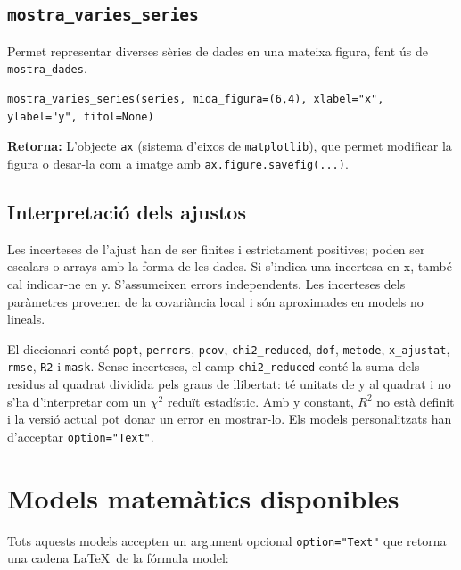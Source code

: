 \documentclass[11pt,a4paper]{article}
\begin{document}
\subsection{\texttt{mostra\_varies\_series}}
Permet representar diverses sèries de dades en una mateixa figura, fent ús de \texttt{mostra\_dades}.
\begin{lstlisting}
mostra_varies_series(series, mida_figura=(6,4), xlabel="x", ylabel="y", titol=None)
\end{lstlisting}
\textbf{Retorna:} L’objecte \texttt{ax} (sistema d’eixos de \texttt{matplotlib}),
que permet modificar la figura o desar-la com a imatge amb \texttt{ax.figure.savefig(...)}.

\subsection{Interpretació dels ajustos}
Les incerteses de l'ajust han de ser finites i estrictament positives;
poden ser escalars o arrays amb la forma de les dades. Si s'indica una
incertesa en x, també cal indicar-ne en y. S'assumeixen errors independents.
Les incerteses dels paràmetres provenen de la covariància local i són
aproximades en models no lineals.

El diccionari conté \texttt{popt}, \texttt{perrors}, \texttt{pcov},
\texttt{chi2\_reduced}, \texttt{dof}, \texttt{metode}, \texttt{x\_ajustat},
\texttt{rmse}, \texttt{R2} i \texttt{mask}.
Sense incerteses, el camp \texttt{chi2\_reduced} conté la suma dels residus
al quadrat dividida pels graus de llibertat: té unitats de y al quadrat i
no s'ha d'interpretar com un $\chi^2$ reduït estadístic.
Amb y constant, $R^2$ no està definit i la versió actual pot donar un error
en mostrar-lo. Els models personalitzats han d'acceptar \texttt{option="Text"}.

\section{Models matemàtics disponibles}

Tots aquests models accepten un argument opcional \texttt{option="Text"} que retorna una cadena \LaTeX\ de la fórmula model:
\end{document}
